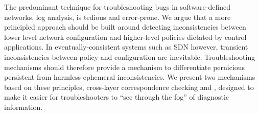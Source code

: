 The predominant technique for troubleshooting bugs in software-defined networks,
log analysis, is tedious and error-prone. We argue that a more principled
approach should be built around detecting inconsistencies between lower level network configuration
and higher-level policies dictated by control applications. In
eventually-consistent systems such as SDN however,
transient inconsistencies between policy and configuration are inevitable.
Troubleshooting mechanisms should therefore provide a mechanism to differentiate
pernicious persistent from harmless ephemeral inconsistencies. We present two
mechanisms based on these principles, cross-layer correspondence checking and \simulator,
designed to make it easier for troubleshooters to ``see through the fog'' of
diagnostic information.
